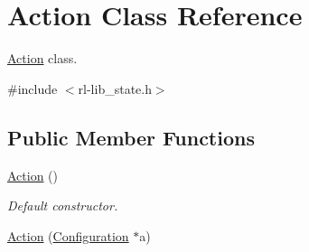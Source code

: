\hypertarget{classAction}{\section{Action Class Reference}
\label{classAction}
}


\hyperlink{classAction}{Action} class.  




{\ttfamily \#include $<$rl-\/lib\-\_\-state.\-h$>$}

\subsection*{Public Member Functions}
\begin{DoxyCompactItemize}
\item 
\hyperlink{classAction_a4f457ccfc8336b565cadca56b36e0271}{Action} ()
\begin{DoxyCompactList}\small\item\em Default constructor. \end{DoxyCompactList}\item 
\hypertarget{classAction_a4e058e0238731bf8e3368ce213b70fcf}{\hyperlink{classAction_a4e058e0238731bf8e3368ce213b70fcf}{Action} (\hyperlink{classConfiguration}{Configuration} $\ast$a)}\label{classAction_a4e058e0238731bf8e3368ce213b70fcf}


\end{DoxyCompactItemize}
